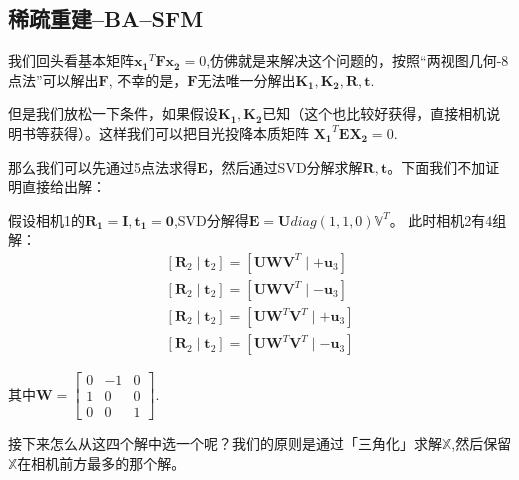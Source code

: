 \documentclass[12pt]{article}
\begin{document}
\subsection{稀疏重建--BA--SFM}
我们回头看基本矩阵$\mathbf{x_1}^T\mathbf{Fx_2}=0$,仿佛就是来解决这个问题的，按照“两视图几何-8点法”可以解出$\mathbf{F}$,
不幸的是，$\mathbf{F}$无法唯一分解出$\mathbf{K_1,K_2,R,t}$.

但是我们放松一下条件，如果假设$\mathbf{K_1,K_2}$已知（这个也比较好获得，直接相机说明书等获得）。这样我们可以把目光投降本质矩阵
$\mathbf{X_1}^T\mathbf{EX_2}=0$.

那么我们可以先通过5点法求得$\mathbf{E}$，然后通过SVD分解求解$\mathbf{R,t}$。下面我们不加证明直接给出解：

假设相机1的$\mathbf{R_1=I,t_1=0}$,SVD分解得$\mathbf{E=U}diag(1,1,0)\mathbb{V}^T$。
此时相机2有4组解：
\begin{equation}
    \nonumber
    \begin{array}{l}
        {\left[\mathbf{R}_{2} \mid \mathbf{t}_{2}\right]=\left[\mathbf{U} \mathbf{W} \mathbf{V}^{T} \mid+\mathbf{u}_{3}\right]} \\
        {\left[\mathbf{R}_{2} \mid \mathbf{t}_{2}\right]=\left[\mathbf{U} \mathbf{W} \mathbf{V}^{T} \mid-\mathbf{u}_{3}\right]} \\
        {\left[\mathbf{R}_{2} \mid \mathbf{t}_{2}\right]=\left[\mathbf{U} \mathbf{W}^{T} \mathbf{V}^{T} \mid+\mathbf{u}_{3}\right]} \\
        {\left[\mathbf{R}_{2} \mid \mathbf{t}_{2}\right]=\left[\mathbf{U} \mathbf{W}^{T} \mathbf{V}^{T} \mid-\mathbf{u}_{3}\right]}
        \end{array}
\end{equation}

其中$\mathbf{W}=\left[\begin{array}{ccc}
    0 & -1 & 0 \\
    1 & 0 & 0 \\
    0 & 0 & 1
    \end{array}\right]$.

接下来怎么从这四个解中选一个呢？我们的原则是通过「三角化」求解$\mathbb{X}$,然后保留$\mathbb{X}$在相机前方最多的那个解。
\end{document}
